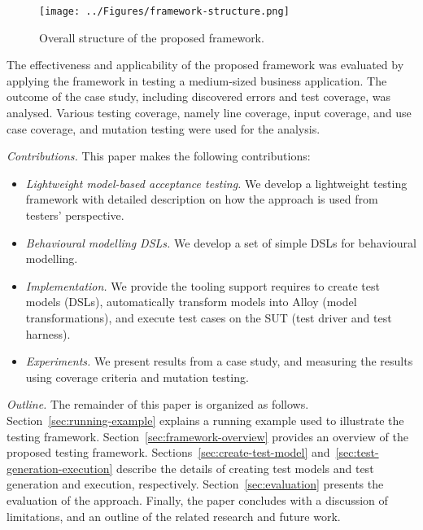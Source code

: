\begin{figure}[!t]
\centering
\texttt{[image: ../Figures/framework-structure.png]}
\caption{Overall structure of the proposed framework.}
\label{fig:framework-structure}
\end{figure}

The effectiveness and applicability of the proposed framework was evaluated by applying the framework in testing a medium-sized business application. The outcome of the case study, including discovered errors and test coverage, was analysed. Various testing coverage, namely line coverage, input coverage, and use case coverage, and mutation testing were used for the analysis.


\textit{Contributions.} This paper makes the following
contributions:
\begin{itemize}
	\item \textit{Lightweight model-based acceptance testing.} We develop a lightweight testing framework with detailed description on how the approach is used from testers' perspective.
	
	\item \textit{Behavioural modelling DSLs.} We develop a set of simple DSLs for behavioural modelling.
	
	\item \textit{Implementation.} We provide the tooling support requires to create test models (DSLs), automatically transform models into Alloy (model transformations), and execute test cases on the SUT (test driver and test harness).
	
	\item \textit{Experiments. } We present results from a case study, and measuring the results using coverage criteria and mutation testing.
\end{itemize}

\textit{Outline.} The remainder of this paper is organized as follows. 
Section~\ref{sec:running-example} explains a running example used to illustrate the testing framework. Section~\ref{sec:framework-overview} provides an overview of the proposed testing framework. Sections~\ref{sec:create-test-model} and~\ref{sec:test-generation-execution} describe the details of creating test models and test generation and execution, respectively. Section~\ref{sec:evaluation} presents the evaluation of the approach. Finally, the paper concludes with a discussion of limitations, and an outline of the related research and future work.
